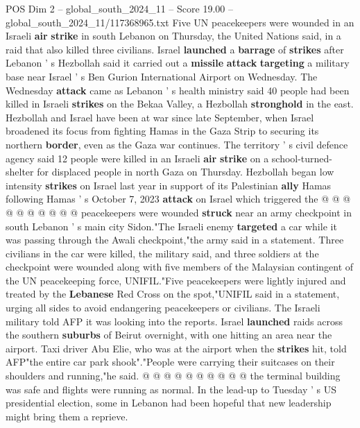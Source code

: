\begin{textsample}{POS Dim 2 – global\_south\_2024\_11 – Score 19.00 – global\_south\_2024\_11/117368965.txt}  \label{ex:f2_pos_176}
Five UN peacekeepers were wounded in an Israeli \textbf{air} \textbf{strike} in south Lebanon on Thursday, the United Nations said, in a raid that also killed three civilians.
Israel \textbf{launched} a \textbf{barrage} of \textbf{strikes} after Lebanon ' s Hezbollah said it carried out a \textbf{missile} \textbf{attack} \textbf{targeting} a military base near Israel ' s Ben Gurion International Airport on Wednesday.
The Wednesday \textbf{attack} came as Lebanon ' s health ministry said 40 people had been killed in Israeli \textbf{strikes} on the Bekaa Valley, a Hezbollah \textbf{stronghold} in the east.
Hezbollah and Israel have been at war since late September, when Israel broadened its focus from fighting Hamas in the Gaza Strip to securing its northern \textbf{border}, even as the Gaza war continues.
The territory ' s civil defence agency said 12 people were killed in an Israeli \textbf{air} \textbf{strike} on a school-turned-shelter for displaced people in north Gaza on Thursday.
Hezbollah began low intensity \textbf{strikes} on Israel last year in support of its Palestinian \textbf{ally} Hamas following Hamas ' s October 7, 2023 \textbf{attack} on Israel which triggered the @ @ @ @ @ @ @ @ @ @ peacekeepers were wounded \textbf{struck} near an army checkpoint in south Lebanon ' s main city Sidon."The Israeli enemy \textbf{targeted} a car while it was passing through the Awali checkpoint,"the army said in a statement.
Three civilians in the car were killed, the military said, and three soldiers at the checkpoint were wounded along with five members of the Malaysian contingent of the UN peacekeeping force, UNIFIL."Five peacekeepers were lightly injured and treated by the \textbf{Lebanese} Red Cross on the spot,"UNIFIL said in a statement, urging all sides to avoid endangering peacekeepers or civilians.
The Israeli military told AFP it was looking into the reports.
Israel \textbf{launched} raids across the southern \textbf{suburbs} of Beirut overnight, with one hitting an area near the airport.
Taxi driver Abu Elie, who was at the airport when the \textbf{strikes} hit, told AFP"the entire car park shook"."People were carrying their suitcases on their shoulders and running,"he said. @ @ @ @ @ @ @ @ @ @ the terminal building was safe and flights were running as normal.
In the lead-up to Tuesday ' s US presidential election, some in Lebanon had been hopeful that new leadership might bring them a reprieve.

\end{textsample}
